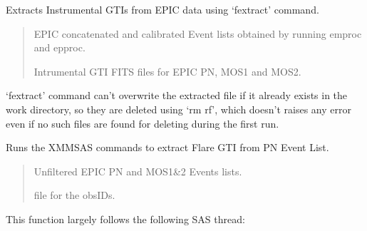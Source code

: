 \documentclass[letterpaper,10pt,english]{sphinxmanual}
\begin{document}
\begin{fulllineitems}
\begin{fulllineitems}
\label{\detokenize{xmmPipeline:xmmPipeline.epicObj.epicObj.extract_InstrumentalGTIs}}
\pysigstartsignatures
{}
\pysigstopsignatures
\sphinxAtStartPar
Extracts Instrumental GTIs from EPIC data using ‘fextract’ command.
\begin{quote}\begin{description}
\sphinxAtStartPar
EPIC concatenated and calibrated Event lists obtained by running
emproc and epproc.

\sphinxAtStartPar
Intrumental GTI FITS files for EPIC PN, MOS1 and MOS2.

\end{description}\end{quote}

\sphinxAtStartPar
‘fextract’ command can’t overwrite the extracted file if it already exists
in the work directory, so they are deleted using ‘rm \sphinxhyphen{}rf’, which doesn’t
raises any error even if no such files are found for deleting during the
first run.

\end{fulllineitems}


\begin{fulllineitems}
\label{\detokenize{xmmPipeline:xmmPipeline.epicObj.epicObj.extract_flareGTI}}
\pysigstartsignatures
{}
\pysigstopsignatures
\sphinxAtStartPar
Runs the XMMSAS commands to extract Flare GTI from PN Event List.
\begin{quote}\begin{description}
\sphinxAtStartPar
Unfiltered EPIC PN and MOS1\&2 Events lists.

\sphinxAtStartPar
{} file for the obsIDs.

\end{description}\end{quote}

\sphinxAtStartPar
This function largely follows the following SAS thread:


\end{fulllineitems}
\end{fulllineitems}
\end{document}
